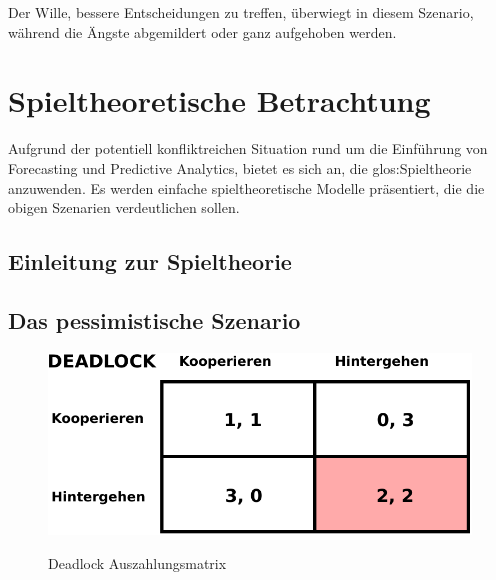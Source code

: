 {%

Der Wille, bessere Entscheidungen zu treffen, überwiegt in diesem Szenario, während
die Ängste abgemildert oder ganz aufgehoben werden.

\section{Spieltheoretische Betrachtung}


Aufgrund der potentiell konfliktreichen Situation rund um die Einführung von
Forecasting und Predictive Analytics, bietet es sich an, die
\gls{glos:Spieltheorie} anzuwenden. Es werden einfache spieltheoretische Modelle
präsentiert, die die obigen Szenarien verdeutlichen sollen.

\subsection{Einleitung zur Spieltheorie}

\subsection{Das pessimistische Szenario}
\begin{figure}%
\centering
\caption{Deadlock Auszahlungsmatrix}
\includegraphics[scale=0.8]{Grafiken/Deadlock_Ink.pdf} 
\label{pic:Deadlock}
\end{figure}


}
